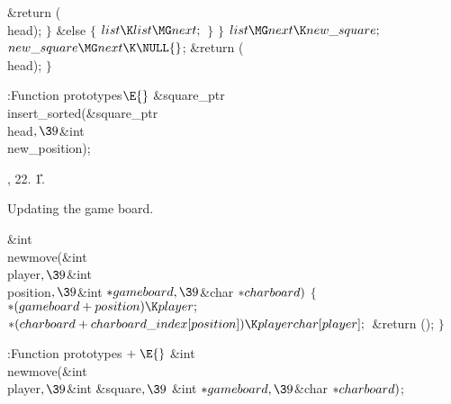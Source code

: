 \&{return} (\\{head});\6
\4${}\}{}$\2\6
\&{else}\5
${}\{{}$\1\6
${}\\{list}\K\\{list}\MG\\{next};{}$\6
\4${}\}{}$\2\6
\4${}\}{}$\2\6
${}\\{list}\MG\\{next}\K\\{new\_square};{}$\6
${}\\{new\_square}\MG\\{next}\K\NULL{}$;\6
\&{return} (\\{head});\6
\4${}\}{}$\2\par
\fi

\B{}:Function prototypes\X${}\E{}$\6
\&{square\_ptr} \\{insert\_sorted}(\&{square\_ptr} \\{head}${},\39{}$\&{int} %
\\{new\_position});\par
{}, 22.
\U1.\fi

Updating the game board.

\Y\B\&{int} \\{newmove}(\&{int} \\{player}${},\39{}$\&{int} \\{position}${},%
\39{}$\&{int} ${}{*}\\{gameboard},\39{}$\&{char} ${}{*}\\{charboard}){}$\1\1\2%
\2\6
${}\{{}$\1\6
${}{*}(\\{gameboard}+\\{position})\K\\{player};{}$\6
${}{*}(\\{charboard}+\\{charboard\_index}[\\{position}])\K\\{playerchar}[%
\\{player}];{}$\6
\&{return} ();\6
\4${}\}{}$\2\par
\fi

\B{}:Function prototypes\X${}\mathrel+\E{}$\6
\&{int} \\{newmove}(\&{int} \\{player}${},\39{}$\&{int} \&{square}${},\39{}$%
\&{int} ${}{*}\\{gameboard},\39{}$\&{char} ${}{*}\\{charboard}){}$;\par
\fi

